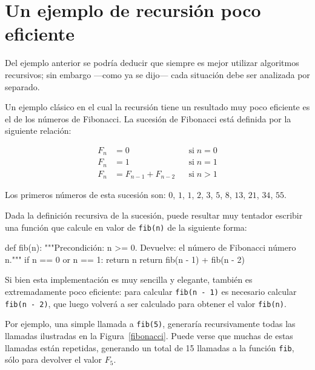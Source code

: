 \section{Un ejemplo de recursión poco eficiente}

Del ejemplo anterior se podría deducir que siempre es mejor utilizar algoritmos
recursivos; sin embargo ---como ya se dijo--- cada situación debe ser analizada por
separado.

Un ejemplo clásico en el cual la recursión tiene un resultado muy poco
eficiente es el de los números de Fibonacci.  La sucesión de Fibonacci está
definida por la siguiente relación:

\begin{align*}
F_n &= 0 &&\text{si}\;n = 0\\
F_n &= 1 &&\text{si}\;n = 1\\
F_n &= F_{n - 1} + F_{n - 2} &&\text{si}\;n > 1
\end{align*}

Los primeros números de esta sucesión son: $0$, $1$, $1$, $2$, $3$, $5$, $8$,
$13$, $21$, $34$, $55$.

Dada la definición recursiva de la sucesión, puede resultar muy tentador
escribir una función que calcule en valor de \lstinline!fib(n)! de la siguiente
forma:

\begin{codigo-python-sn}
def fib(n):
    """Precondición: n >= 0.
       Devuelve: el número de Fibonacci número n."""
    if n == 0 or n == 1:
        return n
    return fib(n - 1) + fib(n - 2)
\end{codigo-python-sn}

Si bien esta implementación es muy sencilla y elegante, también es extremadamente
poco eficiente: para calcular \lstinline!fib(n - 1)! es necesario calcular
\lstinline!fib(n - 2)!, que luego volverá a ser calculado para obtener el valor
\lstinline!fib(n)!.

Por ejemplo, una simple llamada a \lstinline!fib(5)!, generaría
recursivamente todas las llamadas ilustradas en la Figura~\ref{fibonacci}.
Puede verse que muchas de estas llamadas están repetidas, generando un
total de 15 llamadas a la función \lstinline!fib!, sólo para devolver el
valor $F_5$.

